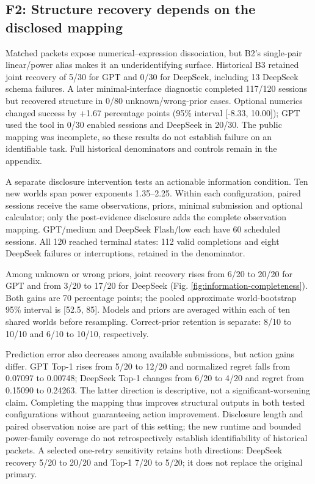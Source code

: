 \documentclass{article}
\begin{document}
\subsection{F2: Structure recovery depends on the disclosed
mapping}\label{f2-structure-recovery-depends-on-the-disclosed-mapping}

Matched packets expose numerical--expression dissociation, but B2's
single-pair linear/power alias makes it an underidentifying surface.
Historical B3 retained joint recovery of 5/30 for GPT and 0/30 for
DeepSeek, including 13 DeepSeek schema failures. A later
minimal-interface diagnostic completed 117/120 sessions but recovered
structure in 0/80 unknown/wrong-prior cases. Optional numerics changed
success by +1.67 percentage points (95\% interval {[}-8.33, 10.00{]});
GPT used the tool in 0/30 enabled sessions and DeepSeek in 20/30. The
public mapping was incomplete, so these results do not establish failure
on an identifiable task. Full historical denominators and controls
remain in the appendix.

A separate disclosure intervention tests an actionable information
condition. Ten new worlds span power exponents 1.35--2.25. Within each
configuration, paired sessions receive the same observations, priors,
minimal submission and optional calculator; only the post-evidence
disclosure adds the complete observation mapping. GPT/medium and
DeepSeek Flash/low each have 60 scheduled sessions. All 120 reached
terminal states: 112 valid completions and eight DeepSeek failures or
interruptions, retained in the denominator.

Among unknown or wrong priors, joint recovery rises from 6/20 to 20/20
for GPT and from 3/20 to 17/20 for DeepSeek (Fig.
\ref{fig:information-completeness}). Both gains are 70 percentage
points; the pooled approximate world-bootstrap 95\% interval is {[}52.5,
85{]}. Models and priors are averaged within each of ten shared worlds
before resampling. Correct-prior retention is separate: 8/10 to 10/10
and 6/10 to 10/10, respectively.

Prediction error also decreases among available submissions, but action
gains differ. GPT Top-1 rises from 5/20 to 12/20 and normalized regret
falls from 0.07097 to 0.00748; DeepSeek Top-1 changes from 6/20 to 4/20
and regret from 0.15090 to 0.24263. The latter direction is descriptive,
not a significant-worsening claim. Completing the mapping thus improves
structural outputs in both tested configurations without guaranteeing
action improvement. Disclosure length and paired observation noise are
part of this setting; the new runtime and bounded power-family coverage
do not retrospectively establish identifiability of historical packets.
A selected one-retry sensitivity retains both directions: DeepSeek
recovery 5/20 to 20/20 and Top-1 7/20 to 5/20; it does not replace the
original primary.
\end{document}
